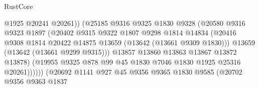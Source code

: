 \begin{lexlean}{RustCore}
\begin{coremodule}
                                        @1925
                                        @20241
                                        @20261))
                                    (@25185
                                      @9316
                                      @9325
                                      @1830
                                      @9328
                                      (@20580
                                        @9316
                                        @9323
                                        @1897
                                        (@20402
                                          @9315
                                          @9322
                                          @1807
                                          @9298
                                          @1814
                                          @14834
                                          (@20416
                                            @9308
                                            @1814
                                            @20422
                                            @14875
                                            @13659
                                            (@13642 (@13661 @9309 @1830)))
                                          @13659
                                          (@13642 (@13661 @9299 @9315)))
                                        @13857
                                        @13860
                                        @13863
                                        @13867
                                        @13872
                                        @13878)
                                      (@19955
                                        @9325
                                        @878
                                        @99
                                        @45
                                        @1830
                                        @7046
                                        @1830
                                        @1925
                                        @25316
                                        @20261))))))
                            (@20692
                              @1141
                              @927
                              @45
                              @9356
                              @9365
                              @1830
                              @9585
                              (@20702
                                @9356
                                @9363
                                @1837

\end{coremodule}
\end{lexlean}
